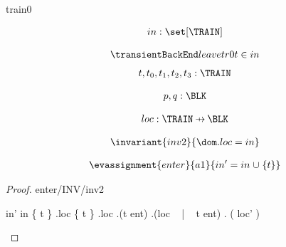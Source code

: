 \documentclass[12pt]{amsart}
\title{}
\author{}
\date{} %
\begin{document}
\maketitle
\tableofcontents


\begin{machine}{train0}

\newset{\TRAIN}
\newset{\BLK}
\newset{\LOC}

%
	\begin{align*}
\variable{		in : \set[\TRAIN]}
	\end{align*}
%



\begin{align*}
\transientB{leave}{tr0}
{ \index{t}{t' = t} }
{	t \in in	}
\end{align*}
\begin{align*}
\dummy{	t,t_0,t_1,t_2,t_3 : \TRAIN}
\end{align*}

\begin{align*}
\dummy{	p,q : \BLK}
\end{align*}


\begin{align*}
\variable{	loc : \TRAIN \pfun \BLK}
\end{align*}

\begin{align*}
\invariant{inv2}
{	\dom . loc = in	}
\end{align*}

\begin{align*}
\evassignment{enter}{a1}
{	in' = in \bunion \{ t \}	}
\end{align*}

\begin{proof}{enter/INV/inv2}
	\begin{calculation}
		in'
	\hint{=}{ \ref{a1} }
		in \bunion \{ t \}
	\hint{=}{ \ref{inv2} }
		\dom.loc \bunion \{ t \}
		\dom.loc \bunion \dom.(t \fun ent)
		\dom.(loc ~  | ~  t \fun ent)
	\hint{=}{ \ref{a2} }
		\dom. ( loc' )
	\end{calculation}
\end{proof}


\end{machine}
\end{document}
